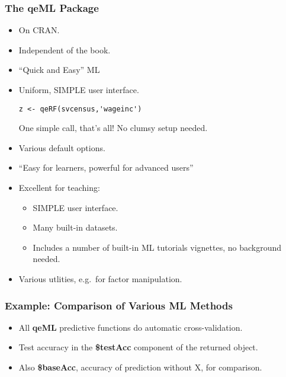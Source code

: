 \documentclass{beamer}
\begin{document}
\begin{frame}[fragile] 
\frametitle{The qeML Package}

\begin{itemize}

\item On CRAN.

\item Independent of the book. 

\item ``Quick and Easy'' ML

\item Uniform, {\Large SIMPLE} user interface.  

\begin{lstlisting}
z <- qeRF(svcensus,'wageinc')
\end{lstlisting} 

One simple call, that's all!  No clumsy setup needed.

\item Various default options.

\item ``Easy for learners, powerful for advanced users''

\item Excellent for teaching:

\begin{itemize}

\item {\Large SIMPLE} user interface.

\item Many built-in datasets.

\item Includes a number of built-in ML tutorials vignettes, no
background needed.

\end{itemize} 

\item Various utlities, e.g.\ for factor manipulation.

\end{itemize} 

\end{frame} 

\begin{frame} 
\frametitle{Example: Comparison of Various ML Methods}

\begin{itemize}

\item All \textbf{qeML} predictive functions do automatic cross-validation.

\item Test accuracy in the \textbf{\$testAcc} component of the returned object.

\item Also \textbf{\$baseAcc}, accuracy of prediction without X, for
comparison.

\end{itemize} 

\end{frame} 
\end{document}

